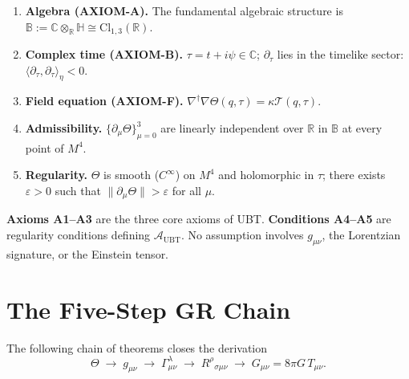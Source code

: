 \documentclass[12pt,a4paper]{article}
\theoremstyle{definition}
\theoremstyle{remark}
\newcommand{\B}{\mathbb{B}}
\newcommand{\R}{\mathbb{R}}
\newcommand{\C}{\mathbb{C}}
\newcommand{\Hquat}{\mathbb{H}}
\newcommand{\Aubt}{\mathcal{A}_{\mathrm{UBT}}}
\newcommand{\Gmn}{G_{\mu\nu}}
\newcommand{\gmn}{g_{\mu\nu}}
\newcommand{\Tmn}{T_{\mu\nu}}
\newcommand{\pT}{\partial_\tau}
\begin{document}
\begin{tcolorbox}[colback=gray!4!white,colframe=gray!50!black,
  title=Complete Assumption List (A1--A5)]
\begin{enumerate}[label=\textbf{A\arabic*.}]
  \item \label{assum:algebra}
    \textbf{Algebra (AXIOM-A).} The fundamental algebraic structure is
    $\B := \C\otimes_\R\Hquat \cong \mathrm{Cl}_{1,3}(\R)$.

  \item \label{assum:time}
    \textbf{Complex time (AXIOM-B).} $\tau = t + i\psi \in \C$;
    $\pT$ lies in the timelike sector: $\langle\pT,\pT\rangle_\eta < 0$.

  \item \label{assum:field}
    \textbf{Field equation (AXIOM-F).}
    $\nabla^\dagger\nabla\Theta(q,\tau) = \kappa\mathcal{T}(q,\tau)$.

  \item \label{assum:indep}
    \textbf{Admissibility.}
    $\{\partial_\mu\Theta\}_{\mu=0}^3$ are linearly independent over $\R$ in $\B$
    at every point of $M^4$.

  \item \label{assum:smooth}
    \textbf{Regularity.}
    $\Theta$ is smooth ($C^\infty$) on $M^4$ and holomorphic in $\tau$; there
    exists $\varepsilon > 0$ such that $\|\partial_\mu\Theta\| > \varepsilon$
    for all $\mu$.
\end{enumerate}
\end{tcolorbox}

\textbf{Axioms A1--A3} are the three core axioms of UBT.
\textbf{Conditions A4--A5} are regularity conditions defining $\Aubt$.
No assumption involves $\gmn$, the Lorentzian signature, or the Einstein tensor.

\section{The Five-Step GR Chain}
\label{sec:grchain}

The following chain of theorems closes the derivation
\[
  \Theta \;\longrightarrow\; \gmn \;\longrightarrow\;
  \Gamma^\lambda_{\mu\nu} \;\longrightarrow\;
  R^\rho{}_{\sigma\mu\nu} \;\longrightarrow\;
  \Gmn = 8\pi G\,\Tmn.
\]
\end{document}
